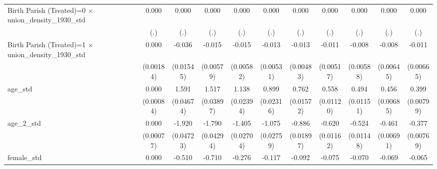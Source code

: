 {\begin{tabular}{l*{10}{c}}
Birth Parish (Treated)=0 $\times$ union\_density\_1930\_std&       0.000         &       0.000         &       0.000         &       0.000         &       0.000         &       0.000         &       0.000         &       0.000         &       0.000         &       0.000         \\
                    &         (.)         &         (.)         &         (.)         &         (.)         &         (.)         &         (.)         &         (.)         &         (.)         &         (.)         &         (.)         \\
Birth Parish (Treated)=1 $\times$ union\_density\_1930\_std&       0.000         &      -0.036\sym{*}  &      -0.015\sym{**} &      -0.015\sym{*}  &      -0.013\sym{*}  &      -0.013\sym{**} &      -0.011\sym{*}  &      -0.008         &      -0.008         &      -0.011         \\
                    &   (0.00184)         &   (0.01545)         &   (0.00579)         &   (0.00582)         &   (0.00531)         &   (0.00483)         &   (0.00517)         &   (0.00588)         &   (0.00645)         &   (0.00665)         \\
age\_std             &       0.000         &       1.591\sym{***}&       1.517\sym{***}&       1.138\sym{***}&       0.899\sym{***}&       0.762\sym{***}&       0.558\sym{***}&       0.494\sym{***}&       0.456\sym{***}&       0.399\sym{***}\\
                    &   (0.00084)         &   (0.04674)         &   (0.03897)         &   (0.02394)         &   (0.02316)         &   (0.01572)         &   (0.01120)         &   (0.01151)         &   (0.00685)         &   (0.00799)         \\
age\_2\_std           &       0.000         &      -1.920\sym{***}&      -1.790\sym{***}&      -1.405\sym{***}&      -1.075\sym{***}&      -0.886\sym{***}&      -0.620\sym{***}&      -0.524\sym{***}&      -0.461\sym{***}&      -0.377\sym{***}\\
                    &   (0.00077)         &   (0.04723)         &   (0.04294)         &   (0.02704)         &   (0.02759)         &   (0.01897)         &   (0.01162)         &   (0.01148)         &   (0.00691)         &   (0.00769)         \\
female\_std          &       0.000         &      -0.510\sym{***}&      -0.710\sym{***}&      -0.276\sym{***}&      -0.117\sym{***}&      -0.092\sym{***}&      -0.075\sym{***}&      -0.070\sym{***}&      -0.069\sym{***}&      -0.065\sym{***}\\

\end{tabular}}
